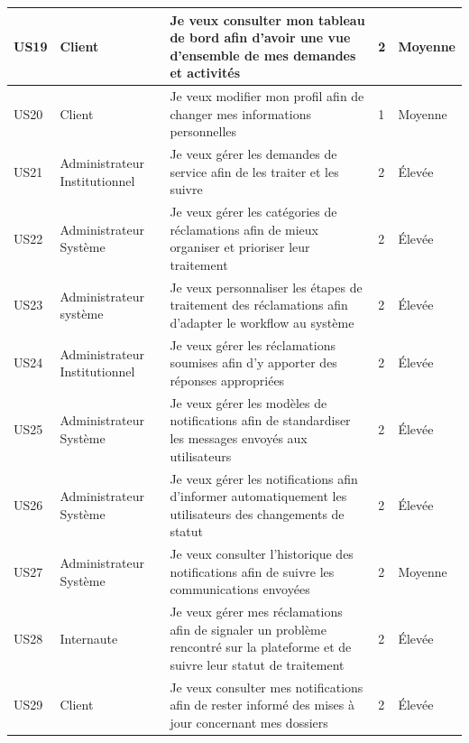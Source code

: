 \begin{longtable}{|p{1cm}|p{3cm}|p{6.5cm}|p{1.5cm}|p{2cm}|}
US19 & Client & Je veux consulter mon tableau de bord afin d'avoir une vue d'ensemble de mes demandes et activités & 2 & Moyenne \\ \hline
US20 & Client & Je veux modifier mon profil afin de changer mes informations personnelles & 1 & Moyenne \\ \hline
US21 & Administrateur Institutionnel & Je veux gérer les demandes de service afin de les traiter et les suivre & 2 & Élevée \\ \hline
US22 & Administrateur Système & Je veux gérer les catégories de réclamations afin de mieux organiser et prioriser leur traitement & 2 & Élevée \\ \hline
US23 & Administrateur système & Je veux personnaliser les étapes de traitement des réclamations afin d'adapter le workflow au système & 2 & Élevée \\ \hline
US24 & Administrateur Institutionnel & Je veux gérer les réclamations soumises afin d'y apporter des réponses appropriées & 2 & Élevée \\ \hline
US25 & Administrateur Système & Je veux gérer les modèles de notifications afin de standardiser les messages envoyés aux utilisateurs & 2 & Élevée \\ \hline
US26 & Administrateur Système & Je veux gérer les notifications afin d'informer automatiquement les utilisateurs des changements de statut & 2 & Élevée \\ \hline
US27 & Administrateur Système & Je veux consulter l'historique des notifications afin de suivre les communications envoyées & 2 & Moyenne \\ \hline
US28 & Internaute & Je veux gérer mes réclamations afin de signaler un problème rencontré sur la plateforme et de suivre leur statut de traitement & 2 & Élevée \\ \hline
US29 & Client & Je veux consulter mes notifications afin de rester informé des mises à jour concernant mes dossiers & 2 & Élevée \\ \hline


\end{longtable}
